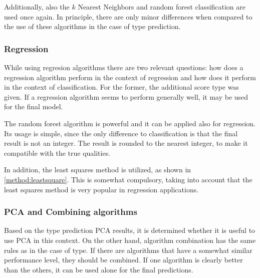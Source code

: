 \documentclass[twoside]{article}
\begin{document}
\begin{multicols}{2}
Additionally, also the $k$ Nearest Neighbors and random forest classification are used once again. In principle, there are only minor
differences when compared to the use of these algorithms in the case of type prediction.

\subsubsection{Regression}

While using regresion algorithms there are two relevant questions: how does a regression algorithm perform in the context
of regression and how does it perform in the context of classification. For the former, the additional score type was
given. If a regression algorithm seems to perform generally well, it may be used for the final model.

The random forest algorithm is powerful and it can be applied also for regression. Its usage is simple,
since the only difference to classification is that the final result is not an integer. The result is rounded to the nearest
integer, to make it compatible with the true qualities.

In addition, the least squares method is utilized, as shown in \ref{method:leastsquare}. This is somewhat compulsory, taking
into account that the least squares method is very popular in regression applications.

\subsubsection{PCA and Combining algorithms}

Based on the type prediction PCA results, it is determined whether it is useful to use PCA 
in this context. On the other hand, algorithm combination has the same rules as in the case of 
type. If there are algorithms that have a somewhat similar performance level, they should be
combined. If one algorithm is clearly better than the others, it can be used alone for the final predictions.



\end{multicols}
\end{document}
